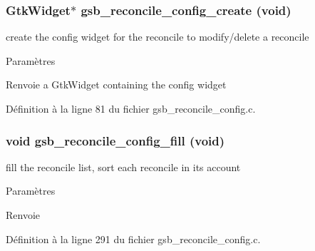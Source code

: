 \subsubsection[{gsb\_\-reconcile\_\-config\_\-create}]{\setlength{\rightskip}{0pt plus 5cm}GtkWidget$\ast$ gsb\_\-reconcile\_\-config\_\-create (void)}\label{gsb__reconcile__config_8h_abf6c093002bc28727d4a18adc03dc8a6}
create the config widget for the reconcile to modify/delete a reconcile


\begin{DoxyParams}{Paramètres}
\item[{\em }]\end{DoxyParams}
\begin{DoxyReturn}{Renvoie}
a GtkWidget containing the config widget 
\end{DoxyReturn}


Définition à la ligne 81 du fichier gsb\_\-reconcile\_\-config.c.

\subsubsection[{gsb\_\-reconcile\_\-config\_\-fill}]{\setlength{\rightskip}{0pt plus 5cm}void gsb\_\-reconcile\_\-config\_\-fill (void)}\label{gsb__reconcile__config_8h_ad5401fdce4c4df7cc8807a3aba71721c}
fill the reconcile list, sort each reconcile in its account


\begin{DoxyParams}{Paramètres}
\item[{\em }]\end{DoxyParams}
\begin{DoxyReturn}{Renvoie}

\end{DoxyReturn}


Définition à la ligne 291 du fichier gsb\_\-reconcile\_\-config.c.

